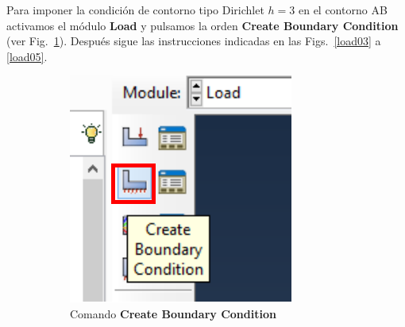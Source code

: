   Para imponer la condición de contorno tipo Dirichlet $h=3$ en el
  contorno AB activamos el módulo \textbf{Load} y pulsamos la orden
  \textbf{Create Boundary Condition} (ver Fig.~\ref{load02}). Después
  sigue las instrucciones indicadas en las Figs.~\ref{load03} a
  \ref{load05}.

  \begin{figure}
    \centering
    \begin{subfigure}[!h]{0.25\textwidth}
      \includegraphics[width=\textwidth]{./body/images/load02.pdf}
      \caption{Comando \textbf{Create Boundary Condition}}
      \label{load02}
    \end{subfigure}%
    ~ %
    \begin{subfigure}[!h]{0.45\textwidth}

\end{subfigure}
\end{figure}
